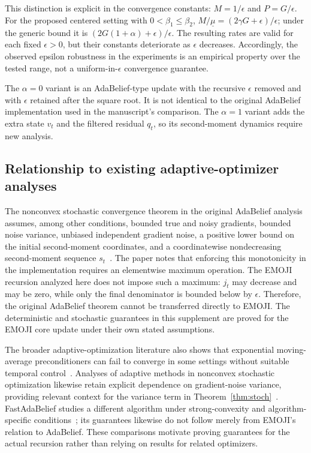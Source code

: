 \documentclass[11pt]{article}
\begin{document}
This distinction is explicit in the convergence constants: $M=1/\epsilon$ and $P=G/\epsilon$. For the proposed centered setting with $0<\beta_1\leq\beta_2$, $M/\underline\mu=(2\gamma G+\epsilon)/\epsilon$; under the generic bound it is $(2G(1+\alpha)+\epsilon)/\epsilon$. The resulting rates are valid for each fixed $\epsilon>0$, but their constants deteriorate as $\epsilon$ decreases. Accordingly, the observed epsilon robustness in the experiments is an empirical property over the tested range, not a uniform-in-$\epsilon$ convergence guarantee.

The $\alpha=0$ variant is an AdaBelief-type update with the recursive $\epsilon$ removed and with $\epsilon$ retained after the square root. It is not identical to the original AdaBelief implementation used in the manuscript's comparison. The $\alpha=1$ variant adds the extra state $v_t$ and the filtered residual $q_t$, so its second-moment dynamics require new analysis.

\subsection{Relationship to existing adaptive-optimizer analyses}
The nonconvex stochastic convergence theorem in the original AdaBelief analysis assumes, among other conditions, bounded true and noisy gradients, bounded noise variance, unbiased independent gradient noise, a positive lower bound on the initial second-moment coordinates, and a coordinatewise nondecreasing second-moment sequence $s_t$~\cite{Zhuang2020}. The paper notes that enforcing this monotonicity in the implementation requires an elementwise maximum operation. The EMOJI recursion analyzed here does not impose such a maximum: $j_t$ may decrease and may be zero, while only the final denominator is bounded below by $\epsilon$. Therefore, the original AdaBelief theorem cannot be transferred directly to EMOJI. The deterministic and stochastic guarantees in this supplement are proved for the EMOJI core update under their own stated assumptions.

The broader adaptive-optimization literature also shows that exponential moving-average preconditioners can fail to converge in some settings without suitable temporal control~\cite{Reddi2018}. Analyses of adaptive methods in nonconvex stochastic optimization likewise retain explicit dependence on gradient-noise variance, providing relevant context for the variance term in Theorem~\ref{thm:stoch}~\cite{Zaheer2018}. FastAdaBelief studies a different algorithm under strong-convexity and algorithm-specific conditions~\cite{Zhou2023}; its guarantees likewise do not follow merely from EMOJI's relation to AdaBelief. These comparisons motivate proving guarantees for the actual recursion rather than relying on results for related optimizers.
\end{document}
